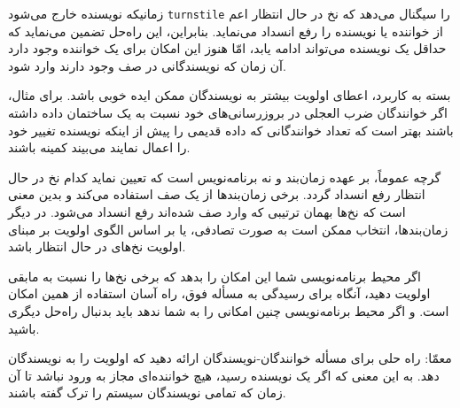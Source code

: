 \documentclass{book}
\begin{document}
    زمانیکه نویسنده خارج می‌شود  {\tt turnstile} را سیگنال می‌دهد که نخ‌ در حال انتظار اعم از خواننده یا نویسنده را رفع انسداد می‌نماید. 
    بنابراین، این راه‌حل تضمین می‌نماید که حداقل یک نویسنده می‌تواند ادامه یابد، امّا هنوز این امکان برای یک خواننده وجود دارد آن زمان که 
    نویسندگانی در صف وجود دارند وارد شود. 
    
    بسته به کاربرد، اعطای اولویت بیشتر به نویسندگان ممکن ایده خوبی باشد. برای مثال، اگر خوانندگان ضرب العجلی در بروزرسانی‌های خود 
    نسبت به یک ساختمان داده‌ داشته باشند 
    بهتر است که تعداد خوانندگانی که داده قدیمی را پیش از اینکه نویسنده تغییر خود را اعمال نمایند می‌بیند کمینه باشند. 

    گرچه عموماً، بر عهده زمان‌بند و نه برنامه‌نویس است که تعیین نماید کدام نخ در حال انتظار رفع انسداد گردد. 
    برخی زمان‌بندها از یک صف  استفاده می‌کند و بدین معنی است که نخ‌ها بهمان ترتیبی که 
    وارد صف شده‌اند رفع انسداد می‌شود. در دیگر زمان‌بندها، انتخاب ممکن است به صورت تصادفی، یا بر اساس الگوی اولویت  
    بر مبنای اولویت نخ‌های در حال انتظار باشد. 

    اگر محیط برنامه‌نویسی شما این امکان را بدهد که برخی نخ‌ها را نسبت به مابقی اولویت دهید، آنگاه برای رسیدگی به مسأله فوق، راه آسان استفاده از همین امکان است. 
    و اگر محیط برنامه‌نویسی چنین امکانی را به شما ندهد باید بدنبال راه‌حل دیگری باشید. 

    معمّا: راه حلی برای مسأله خوانندگان-نویسندگان ارائه دهید که اولویت را به نویسندگان  دهد. به این معنی که اگر یک نویسنده رسید، هیچ خواننده‌ای  
    مجاز به ورود نباشد تا آن زمان که تمامی نویسندگان سیستم را ترک گفته باشند. 
\end{document}
